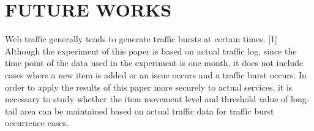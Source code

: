 \documentclass[sigconf,anonymous=true]{acmart}
\begin{document}
%
%
\section{FUTURE WORKS}
Web traffic generally tends to generate traffic bursts at certain times. [1] Although the experiment of this paper is based on actual traffic log, since the time point of the data used in the experiment is one month, it does not include cases where a new item is added or an issue occurs and a traffic burst occurs.
In order to apply the results of this paper more securely to actual services, it is necessary to study whether the item movement level and threshold value of long-tail area can be maintained based on actual traffic data for traffic burst occurrence cases.




\nocite{*}






%
\end{document}
